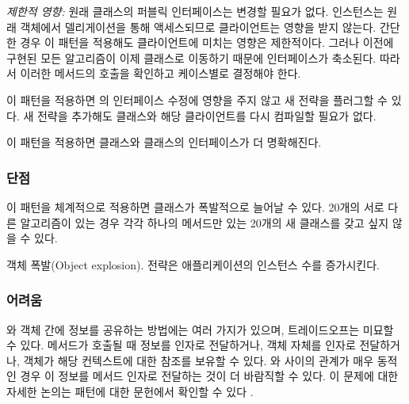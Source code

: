\documentclass[a4paper,10pt,twoside]{book}
\begin{document}
\begin{bulletlist}
\item \emph{제한적 영향:} 원래 클래스의 퍼블릭 인터페이스는 변경할 필요가 없다.  인스턴스는 원래 객체에서 델리게이션을 통해 액세스되므로 클라이언트는 영향을 받지 않는다. 간단한 경우 이 패턴을 적용해도 클라이언트에 미치는 영향은 제한적이다. 그러나 이전에 구현된 모든 알고리즘이 이제  클래스로 이동하기 때문에  인터페이스가 축소된다. 따라서 이러한 메서드의 호출을 확인하고 케이스별로 결정해야 한다. 

\item 이 패턴을 적용하면 의 인터페이스 수정에 영향을 주지 않고 새 전략을 플러그할 수 있다. 새 전략을 추가해도  클래스와 해당 클라이언트를 다시 컴파일할 필요가 없다. 

\item 이 패턴을 적용하면  클래스와  클래스의 인터페이스가 더 명확해진다.
\end{bulletlist}

\subsubsection*{단점}

\begin{bulletlist}
\item 이 패턴을 체계적으로 적용하면 클래스가 폭발적으로 늘어날 수 있다. 20개의 서로 다른 알고리즘이 있는 경우 각각 하나의 메서드만 있는 20개의 새 클래스를 갖고 싶지 않을 수 있다. 

\item 객체 폭발(Object explosion). 전략은 애플리케이션의 인스턴스 수를 증가시킨다.
\end{bulletlist}

\subsubsection*{어려움}

\begin{bulletlist}
\item {}와  객체 간에 정보를 공유하는 방법에는 여러 가지가 있으며, 트레이드오프는 미묘할 수 있다.  메서드가 호출될 때 정보를 인자로 전달하거나,  객체 자체를 인자로 전달하거나,  객체가 해당 컨텍스트에 대한 참조를 보유할 수 있다. 와  사이의 관계가 매우 동적인 경우 이 정보를 메서드 인자로 전달하는 것이 더 바람직할 수 있다. 이 문제에 대한 자세한 논의는  패턴에 대한 문헌에서 확인할 수 있다\cite{Gamm95a} \cite{Alpe98a}. 
\end{bulletlist}
\end{document}
